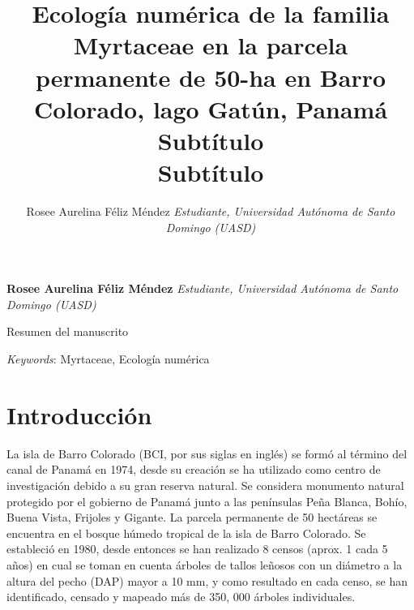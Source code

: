 \documentclass[11pt,]{article}
\title{Ecología numérica de la familia Myrtaceae en la parcela permanente de
50-ha en Barro Colorado, lago Gatún, Panamá\\
Subtítulo\\
Subtítulo  }
\author{\Large Rosee Aurelina Féliz Méndez\vspace{0.05in} \newline\normalsize\emph{Estudiante, Universidad Autónoma de Santo Domingo (UASD)}  }
\date{}
\newcommand*{\authorfont}{\fontfamily{phv}\selectfont}
\renewenvironment{abstract}
 {{%
    \setlength{\leftmargin}{0mm}
    \setlength{\rightmargin}{\leftmargin}%
  }%
  \relax}
 {\endlist}
\begin{document}
	
%

{%
\setlength{\parindent}{0pt}
\thispagestyle{plain}
{\fontsize{18}{20}\selectfont\raggedright 
\maketitle  %

}

{
   \vskip 13.5pt\relax \normalsize\fontsize{11}{12} 
\textbf{\authorfont Rosee Aurelina Féliz Méndez} \hskip 15pt \emph{\small Estudiante, Universidad Autónoma de Santo Domingo (UASD)}   

}

}








\begin{abstract}

    \hbox{\vrule height .2pt width 39.14pc}

    \vskip 8.5pt %

\noindent Resumen del manuscrito


\vskip 8.5pt \noindent \emph{Keywords}: Myrtaceae, Ecología numérica \par

    \hbox{\vrule height .2pt width 39.14pc}



\end{abstract}


\vskip 6.5pt


\noindent  \section{Introducción}\label{introducciuxf3n}

La isla de Barro Colorado (BCI, por sus siglas en inglés) se formó al
término del canal de Panamá en 1974, desde su creación se ha utilizado
como centro de investigación debido a su gran reserva natural. Se
considera monumento natural protegido por el gobierno de Panamá junto a
las penínsulas Peña Blanca, Bohío, Buena Vista, Frijoles y Gigante. La
parcela permanente de 50 hectáreas se encuentra en el bosque húmedo
tropical de la isla de Barro Colorado. Se estableció en 1980, desde
entonces se han realizado 8 censos (aprox. 1 cada 5 años) en cual se
toman en cuenta árboles de tallos leñosos con un diámetro a la altura
del pecho (DAP) mayor a 10 mm, y como resultado en cada censo, se han
identificado, censado y mapeado más de 350, 000 árboles individuales.
\end{document}
